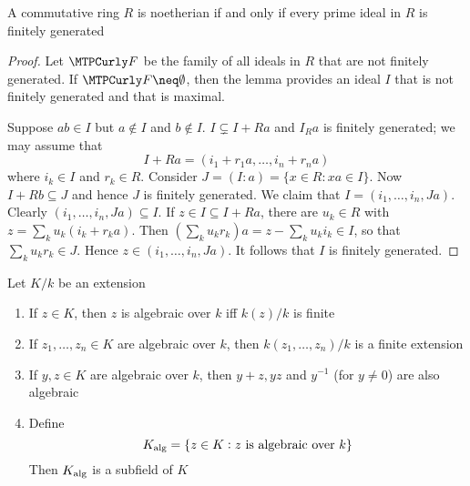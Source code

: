 \documentclass[11pt]{article}
\begin{document}
\begin{theorem}[I. S. Cohen]
A commutative ring \(R\) is noetherian if and only if every prime ideal in \(R\)
is finitely generated
\end{theorem}

\begin{proof}
Let \(\calf\) be the family of all ideals in \(R\) that are not finitely
generated. If \(\calf\neq\emptyset\), then the lemma provides an ideal \(I\)
that is not finitely generated and that is maximal.

Suppose \(ab\in I\) but \(a\not\in I\) and \(b\not\in I\). 
\(I\subsetneq I+Ra\) and \(I_Ra\) is finitely generated; we may assume that 
\begin{equation*}
I+Ra=(i_1+r_1a,\dots,i_n+r_na)
\end{equation*}
where \(i_k\in I\) and \(r_k\in R\). Consider \(J=(I:a)=\{x\in R:xa\in I\}\). 
Now \(I+Rb\subseteq J\) and hence \(J\) is finitely generated. We claim that 
\(I=(i_1,\dots,i_n,Ja)\). Clearly \((i_1,\dots,i_n,Ja)\subseteq I\). If
\(z\in I\subseteq I+Ra\), there are \(u_k\in R\) with 
\(z=\sum_ku_k(i_k+r_ka)\). Then \((\sum_ku_kr_k)a=z-\sum_ku_ki_k\in I\), so
that \(\sum_ku_kr_k\in J\). Hence \(z\in(i_1,\dots,i_n,Ja)\). It follows that
\(I\) is finitely generated.
\end{proof}

\begin{proposition}[]
Let \(K/k\) be an extension
\begin{enumerate}
\item If \(z\in K\), then \(z\) is algebraic over \(k\) iff \(k(z)/k\) is finite
\item If \(z_1,\dots,z_n\in K\) are algebraic over \(k\), then 
\(k(z_1,\dots,z_n)/k\) is a finite extension
\item If \(y,z\in K\) are algebraic over \(k\), then \(y+z,yz\) and \(y^{-1}\)
(for \(y\neq0\)) are also algebraic
\item Define
\begin{equation*}
K_{\operatorname{\text{alg}}}=\{z\in K:z\text{ is algebraic over }k\}
\end{equation*}
Then \(K_{\operatorname{\text{alg}}}\) is a subfield of \(K\)
\end{enumerate}
\end{proposition}
\end{document}
